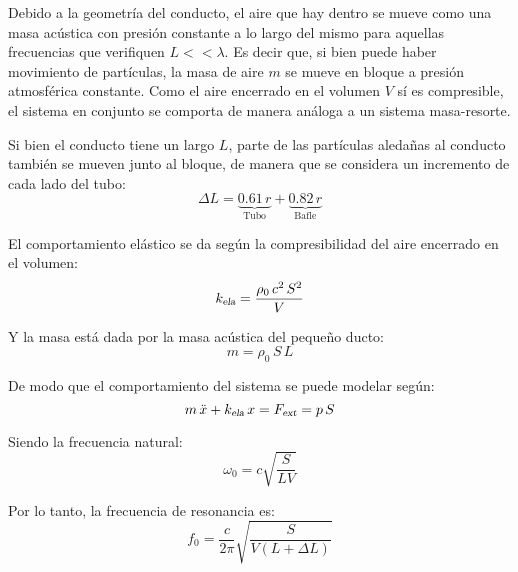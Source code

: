 \documentclass[a5paper,12pt,twoside]{book}
\begin{document}
\begin{center}
    \def\svgwidth{0.8\linewidth}
    
\end{center}

Debido a la geometría del conducto, el aire que hay dentro se mueve como una masa acústica con presión constante a lo largo del mismo para aquellas frecuencias que verifiquen $L<<\lambda$.
Es decir que, si bien puede haber movimiento de partículas, la masa de aire $m$ se mueve en bloque a presión atmosférica constante.
Como el aire encerrado en el volumen $V$ sí es compresible, el sistema en conjunto se comporta de manera análoga a un sistema masa-resorte.

Si bien el conducto tiene un largo $L$, parte de las partículas aledañas al conducto también se mueven junto al bloque, de manera que se considera un incremento de cada lado del tubo:
\begin{equation*}
    \Delta L = \underbrace{0.61 \, r}_{\text{Tubo}} + \underbrace{0.82 \, r}_{\text{Bafle}}
\end{equation*}

El comportamiento elástico se da según la compresibilidad del aire encerrado en el volumen:
\begin{equation*}
    {{k}_\textsl{{ela}}} = \frac{\rho_0 \, c^2 \, S^2}{V}
\end{equation*}

Y la masa está dada por la masa acústica del pequeño ducto:
\begin{equation*}
    m = \rho_0 \, S \, L
\end{equation*}

De modo que el comportamiento del sistema se puede modelar según:
\begin{equation*}
    m \, \ddot{x} + {{k}_\textsl{{ela}}} \, x = {{F}_\textsl{{ext}}} = p \, S
\end{equation*}

Siendo la frecuencia natural:
\begin{equation*}
    \omega_0 = c \sqrt{\frac{S}{LV}}
\end{equation*}

Por lo tanto, la frecuencia de resonancia es:
\begin{equation*}
    f_0 = \frac{c}{2\pi} \sqrt{\frac{S}{V \left( L+ \Delta L \right)}}
\end{equation*}
\end{document}
